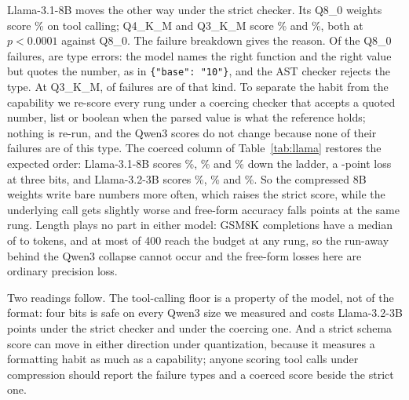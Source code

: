 \documentclass[10pt]{article}
\begin{document}
Llama-3.1-8B moves the other way under the strict checker. Its Q8\_0 weights score \qtAccLlamaEightBEight{}\% on tool calling; Q4\_K\_M and Q3\_K\_M score \qtAccLlamaEightBFour{}\% and \qtAccLlamaEightBThree{}\%, both at $p<0.0001$ against Q8\_0. The failure breakdown gives the reason. Of the \qtLlamaEightBFailsEight{} Q8\_0 failures, \qtLlamaEightBTypeErrEight{} are type errors: the model names the right function and the right value but quotes the number, as in \texttt{\{"base": "10"\}}, and the AST checker rejects the type. At Q3\_K\_M, \qtLlamaEightBTypeErrThree{} of \qtLlamaEightBFailsThree{} failures are of that kind. To separate the habit from the capability we re-score every rung under a coercing checker that accepts a quoted number, list or boolean when the parsed value is what the reference holds; nothing is re-run, and the Qwen3 scores do not change because none of their failures are of this type. The coerced column of Table~\ref{tab:llama} restores the expected order: Llama-3.1-8B scores \qtLlamaEightBCoercedAccEight{}\%, \qtLlamaEightBCoercedAccFour{}\% and \qtLlamaEightBCoercedAccThree{}\% down the ladder, a \qtLlamaEightBCoercedDropThree{}-point loss at three bits, and Llama-3.2-3B scores \qtLlamaThreeBCoercedAccEight{}\%, \qtLlamaThreeBCoercedAccFour{}\% and \qtLlamaThreeBCoercedAccThree{}\%. So the compressed 8B weights write bare numbers more often, which raises the strict score, while the underlying call gets slightly worse and free-form accuracy falls \qtLlamaEightBGsmDropThree{} points at the same rung. Length plays no part in either model: GSM8K completions have a median of \qtLlamaThreeBGsmMedTokEight{} to \qtLlamaEightBGsmMedTokEight{} tokens, and at most \qtLlamaEightBGsmTruncThree{} of 400 reach the budget at any rung, so the run-away behind the Qwen3 collapse cannot occur and the free-form losses here are ordinary precision loss.

Two readings follow. The tool-calling floor is a property of the model, not of the format: four bits is safe on every Qwen3 size we measured and costs Llama-3.2-3B \qtDropLlamaThreeBFour{} points under the strict checker and \qtLlamaThreeBCoercedDropFour{} under the coercing one. And a strict schema score can move in either direction under quantization, because it measures a formatting habit as much as a capability; anyone scoring tool calls under compression should report the failure types and a coerced score beside the strict one.

\begin{table}[t]
\centering\small

\caption{The second family. Tool calling on \texttt{simple\_python}, $n=\qtNEightB{}$ per rung; GSM8K strict accuracy, $n=400$; each model against its own Q8\_0 by McNemar's exact test.}
\label{tab:llama}
\end{table}
\end{document}
